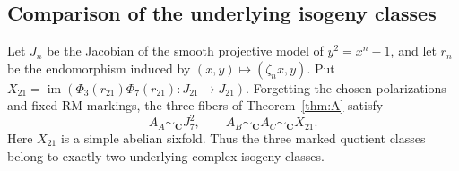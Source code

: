 \subsection{Comparison of the underlying isogeny classes}
\begin{proposition}\label{prop:knownCM}
Let $J_n$ be the Jacobian of the smooth projective model of
$y^2=x^n-1$, and let $r_n$ be the endomorphism induced by
$(x,y)\mapsto(\zeta_nx,y)$. Put
$X_{21}=\operatorname{im}(\Phi_3(r_{21})\Phi_7(r_{21}):J_{21}\to J_{21})$.
Forgetting the chosen polarizations and fixed RM markings, the three fibers
of Theorem~\ref{thm:A} satisfy
\[
 A_A\sim_{\mathbf C}J_7^2,\qquad
 A_B\sim_{\mathbf C}A_C\sim_{\mathbf C}X_{21}.
\]
Here $X_{21}$ is a simple abelian sixfold. Thus the three marked quotient
classes belong to exactly two underlying complex isogeny classes.
\end{proposition}
